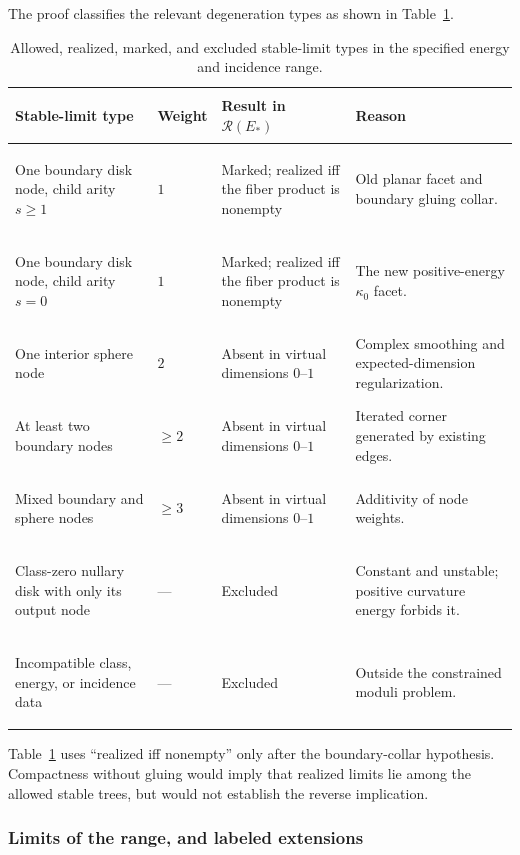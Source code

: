 \documentclass[11pt,letterpaper,twoside]{article}
\theoremstyle{plain}
\theoremstyle{definition}
\theoremstyle{remark}
\begin{document}
The proof classifies the relevant degeneration types as shown in Table~\ref{tab:curvature-compactness-types}.
\begin{table}[t]
\centering
\small
\begin{tabularx}{\textwidth}{@{}>{\bfseries\raggedright\arraybackslash}p{}>{\raggedright\arraybackslash}p{}>{\raggedright\arraybackslash}p{}X@{}}
\toprule
Stable-limit type & Weight & Result in $\mathcal R(E_*)$ & Reason \\
\midrule
One boundary disk node, child arity $s\geq1$ & $1$ & Marked; realized iff the fiber product is nonempty & Old planar facet and boundary gluing collar. \\
One boundary disk node, child arity $s=0$ & $1$ & Marked; realized iff the fiber product is nonempty & The new positive-energy $\kappa_0$ facet. \\
One interior sphere node & $2$ & Absent in virtual dimensions $0$--$1$ & Complex smoothing and expected-dimension regularization. \\
At least two boundary nodes & $\geq2$ & Absent in virtual dimensions $0$--$1$ & Iterated corner generated by existing edges. \\
Mixed boundary and sphere nodes & $\geq3$ & Absent in virtual dimensions $0$--$1$ & Additivity of node weights. \\
Class-zero nullary disk with only its output node & --- & Excluded & Constant and unstable; positive curvature energy forbids it. \\
Incompatible class, energy, or incidence data & --- & Excluded & Outside the constrained moduli problem. \\
\bottomrule
\end{tabularx}
\caption{Allowed, realized, marked, and excluded stable-limit types in the specified energy and incidence range.}
\label{tab:curvature-compactness-types}
\end{table}

Table~\ref{tab:curvature-compactness-types} uses ``realized iff nonempty'' only after the boundary-collar hypothesis.  Compactness without gluing would imply that realized limits lie among the allowed stable trees, but would not establish the reverse implication.

\subsubsection{Limits of the range, and labeled extensions}
\end{document}
